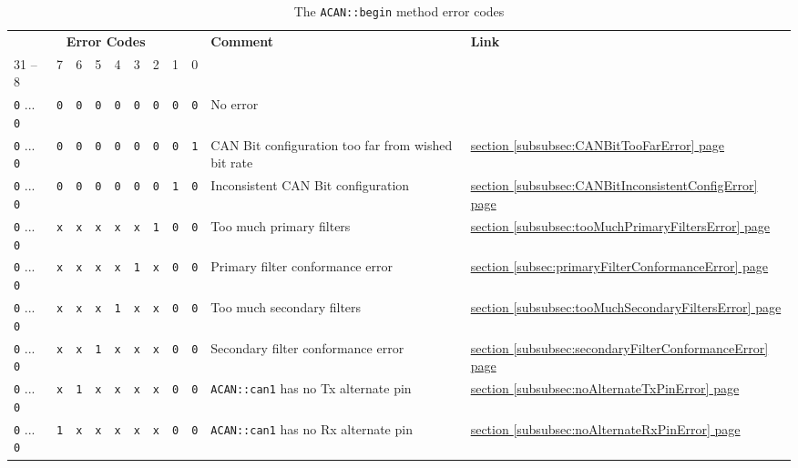 \documentclass[9pt, a4paper, obeyspaces, openany]{extarticle}
\newcommand\refSubsectionPage[1]{\hyperref[subsec:#1]{section \ref*{subsec:#1} page \pageref{subsec:#1}}}
\newcommand\refSubsubsectionPage[1]{\hyperref[subsubsec:#1]{section \ref*{subsubsec:#1} page \pageref{subsubsec:#1}}}
\newcommand\labelTableau[1]{\label{tab:#1}}
\begin{document}
\begin{table}[htbp]
  \small
  \onehalfspacing
  \centering
  \begin{tabular}{lllllllllll}
    \multicolumn{9}{c}{\textbf{Error Codes}} & \textbf{Comment} & \textbf{Link}\\
    31 -- 8 & 7 & 6 & 5 & 4 & 3 & 2 & 1 & 0 & & \\
    \texttt{0} ...  \texttt{0} &\texttt{0} &\texttt{0} &\texttt{0} &\texttt{0} &\texttt{0} &\texttt{0} &\texttt{0} &\texttt{0} & No error & \\
    \texttt{0} ...  \texttt{0} &\texttt{0} &\texttt{0} &\texttt{0} &\texttt{0} &\texttt{0} &\texttt{0} &\texttt{0} &\texttt{1} & CAN Bit configuration too far from wished bit rate & \refSubsubsectionPage{CANBitTooFarError}\\
    \texttt{0} ...  \texttt{0} &\texttt{0} &\texttt{0} &\texttt{0} &\texttt{0} &\texttt{0} &\texttt{0} &\texttt{1} &\texttt{0} & Inconsistent CAN Bit configuration & \refSubsubsectionPage{CANBitInconsistentConfigError}\\
    \texttt{0} ...  \texttt{0} &\texttt{x}&\texttt{x} &\texttt{x} &\texttt{x} &\texttt{x} &\texttt{1} &\texttt{0} &\texttt{0} & Too much primary filters & \refSubsubsectionPage{tooMuchPrimaryFiltersError}\\
    \texttt{0} ...  \texttt{0} &\texttt{x} &\texttt{x} &\texttt{x} &\texttt{x} &\texttt{1} &\texttt{x} &\texttt{0} &\texttt{0} & Primary filter conformance error &  \refSubsectionPage{primaryFilterConformanceError}\\
    \texttt{0} ...  \texttt{0} &\texttt{x}&\texttt{x} &\texttt{x} &\texttt{1} &\texttt{x} &\texttt{x} &\texttt{0} &\texttt{0} & Too much secondary filters & \refSubsubsectionPage{tooMuchSecondaryFiltersError}\\
    \texttt{0} ...  \texttt{0} &\texttt{x}&\texttt{x} &\texttt{1} &\texttt{x} &\texttt{x} &\texttt{x} &\texttt{0} &\texttt{0} & Secondary filter conformance error &  \refSubsubsectionPage{secondaryFilterConformanceError}\\
    \texttt{0} ...  \texttt{0} &\texttt{x}&\texttt{1} &\texttt{x} &\texttt{x} &\texttt{x} &\texttt{x} &\texttt{0} &\texttt{0} & \texttt{ACAN::can1} has no Tx alternate pin & \refSubsubsectionPage{noAlternateTxPinError}\\
    \texttt{0} ...  \texttt{0} &\texttt{1}&\texttt{x} &\texttt{x} &\texttt{x} &\texttt{x} &\texttt{x} &\texttt{0} &\texttt{0} & \texttt{ACAN::can1} has no Rx alternate pin & \refSubsubsectionPage{noAlternateRxPinError} \\
  \end{tabular}
  \caption{The \texttt{ACAN::begin} method error codes}
  \labelTableau{beginErrorCode}
\end{table}
\end{document}
